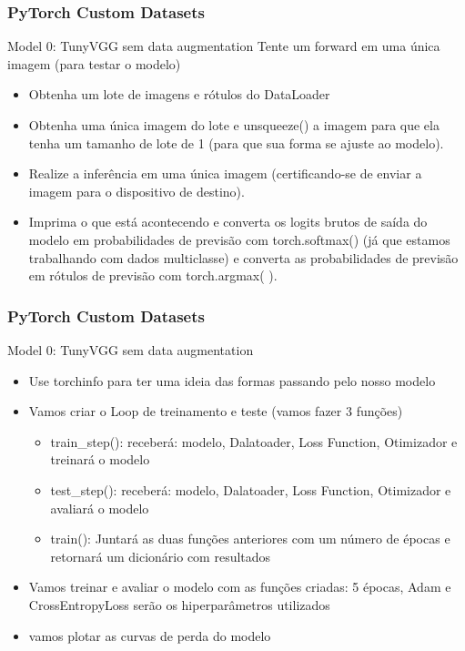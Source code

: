 \documentclass{beamer}
\begin{document}
\begin{frame}
	\frametitle{PyTorch Custom Datasets}
	\begin{block}{Model 0: TunyVGG sem data augmentation}
		Tente um forward em uma única imagem (para testar o modelo)
		\begin{itemize}
			\item Obtenha um lote de imagens e rótulos do DataLoader
			\item Obtenha uma única imagem do lote e unsqueeze() a imagem para que ela tenha um tamanho de lote de 1 (para que sua forma se ajuste ao modelo).
			\item Realize a inferência em uma única imagem (certificando-se de enviar a imagem para o dispositivo de destino).
			\item Imprima o que está acontecendo e converta os logits brutos de saída do modelo em probabilidades de previsão com torch.softmax() (já que estamos trabalhando com dados multiclasse) e converta as probabilidades de previsão em rótulos de previsão com torch.argmax( ).
		\end{itemize}
	\end{block}
\end{frame}  
\begin{frame}
	\frametitle{PyTorch Custom Datasets}
	\begin{block}{Model 0: TunyVGG sem data augmentation}
		\begin{itemize}
			\item Use torchinfo para ter uma ideia das formas passando pelo nosso modelo
			\item Vamos criar o Loop de treinamento e teste (vamos fazer 3 funções)
			\begin{itemize}
				\item train\_step(): receberá: modelo, Dalatoader, Loss Function, Otimizador e treinará o modelo
				\item test\_step(): receberá: modelo, Dalatoader, Loss Function, Otimizador e avaliará o modelo
				\item train(): Juntará as duas funções anteriores com um número de épocas e retornará um dicionário com resultados
			\end{itemize}
			\item Vamos treinar e avaliar o modelo com as funções criadas: 5 épocas, Adam e CrossEntropyLoss serão os hiperparâmetros utilizados
			\item vamos plotar as curvas de perda do modelo
		\end{itemize}
	\end{block}
\end{frame} 
\end{document}
